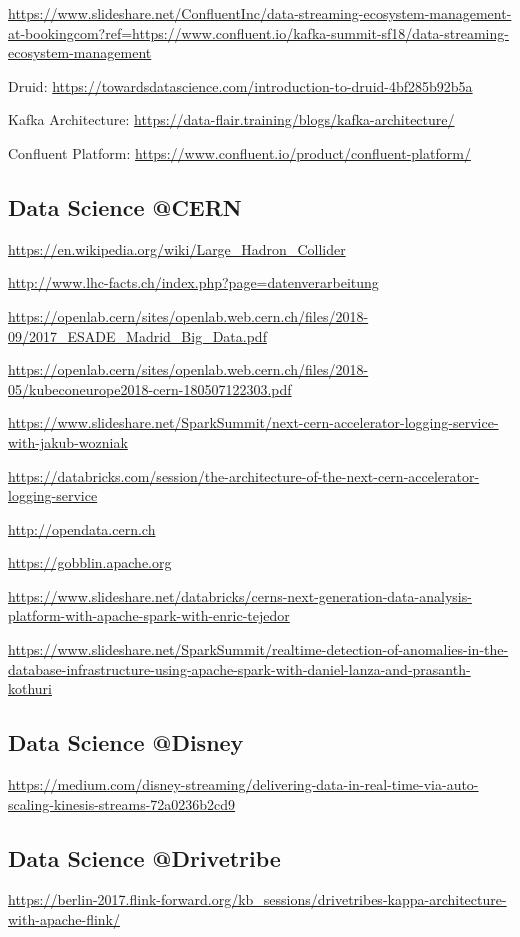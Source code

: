 \documentclass[12pt]{scrartcl} %
\begin{document}
\url{https://www.slideshare.net/ConfluentInc/data-streaming-ecosystem-management-at-bookingcom?ref=https://www.confluent.io/kafka-summit-sf18/data-streaming-ecosystem-management}

Druid:
\url{https://towardsdatascience.com/introduction-to-druid-4bf285b92b5a}

Kafka Architecture:
\url{https://data-flair.training/blogs/kafka-architecture/}

Confluent Platform:
\url{https://www.confluent.io/product/confluent-platform/}


\subsection{Data Science @CERN}
\url{https://en.wikipedia.org/wiki/Large_Hadron_Collider}

\url{http://www.lhc-facts.ch/index.php?page=datenverarbeitung}

\url{https://openlab.cern/sites/openlab.web.cern.ch/files/2018-09/2017_ESADE_Madrid_Big_Data.pdf}

\url{https://openlab.cern/sites/openlab.web.cern.ch/files/2018-05/kubeconeurope2018-cern-180507122303.pdf}

\url{https://www.slideshare.net/SparkSummit/next-cern-accelerator-logging-service-with-jakub-wozniak}

\url{https://databricks.com/session/the-architecture-of-the-next-cern-accelerator-logging-service}

\url{http://opendata.cern.ch}

\url{https://gobblin.apache.org}

\url{https://www.slideshare.net/databricks/cerns-next-generation-data-analysis-platform-with-apache-spark-with-enric-tejedor}

\url{https://www.slideshare.net/SparkSummit/realtime-detection-of-anomalies-in-the-database-infrastructure-using-apache-spark-with-daniel-lanza-and-prasanth-kothuri}


\subsection{Data Science @Disney}
\url{https://medium.com/disney-streaming/delivering-data-in-real-time-via-auto-scaling-kinesis-streams-72a0236b2cd9}

\subsection{Data Science @Drivetribe}
\url{https://berlin-2017.flink-forward.org/kb_sessions/drivetribes-kappa-architecture-with-apache-flink/}
\end{document}
